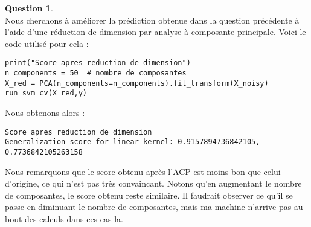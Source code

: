 \documentclass[11pt,a4paper]{article}
\theoremstyle{definition}
\newtheorem{Qu}{Question}
\begin{document}
\begin{Qu}~\\

Nous cherchons à améliorer la prédiction obtenue dans la question précédente à l'aide d'une réduction de dimension par analyse à composante principale. Voici le code utilisé pour cela : 

\begin{verbatim}
print("Score apres reduction de dimension")
n_components = 50  # nombre de composantes
X_red = PCA(n_components=n_components).fit_transform(X_noisy)
run_svm_cv(X_red,y)
\end{verbatim}

Nous obtenons alors : 

\begin{verbatim}
Score apres reduction de dimension
Generalization score for linear kernel: 0.9157894736842105, 0.7736842105263158
\end{verbatim}

Nous remarquons que le score obtenu après l'ACP est moins bon que celui d'origine, ce qui n'est pas très convaincant. Notons qu'en augmentant le nombre de composantes, le score obtenu reste similaire. Il faudrait observer ce qu'il se passe en diminuant le nombre de composantes, mais ma machine n'arrive pas au bout des calculs dans ces cas la. 


 
\end{Qu}
\end{document}

